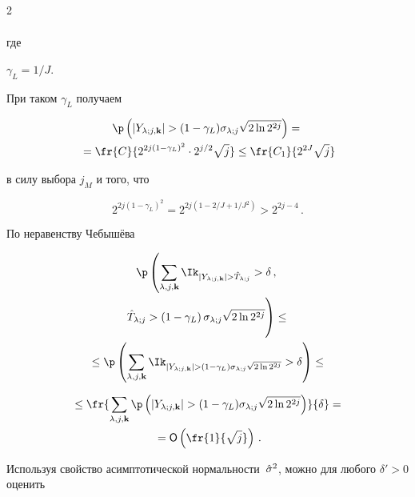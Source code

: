 \begin{multicols}{2}
\begin{multline}
\end{multline}


где


$\gamma_L = 1/J$.


При таком $\gamma_L$ получаем


\begin{multline*}


\p\left( |\Yljk| > (1-\gamma_L)\solj\sqrt{2\ln 2^{2j}} \right) = {}\\


{}=\fr{C}{ 2^{2j(1-\gamma_L)^2}\cdot 2^{j/2}\sqrt{j} } \leq \fr{C_1}{ 2^{2J} \sqrt{j} }


\end{multline*}


в силу выбора $j_M$ и того, что


\begin{equation*}


2^{2j\left(1-\gamma_L\right)^2} = 2^{2j\left( 1-2/J + 1/J^2 \right)} > 2^{2j-4}\,.


\end{equation*}


По неравенству Чебышёва


\begin{multline*}


\p\left(\sumljk\indYjkghTj>\delta\,, \right.\\


\left. \vphantom{\sumljk\indYjkghTj}\hTlj > \left( 1-\gamma_L \right) \solj\sqrt{2\ln 2^{2j}}\right) \leq{}\\


{}\leq \p\left( \sumljk \Ik_{ |\Yljk| > (1-\gamma_L)\solj\sqrt{2\ln 2^{2j}} } > \delta \right) \leq{}


\end{multline*}





\noindent


\begin{multline*}


{}\leq \fr{ \sumljk \p\left( |\Yljk| > (1-\gamma_L)\solj\sqrt{2\ln 2^{2j}} \right) }{\delta} = {}\\


{}=\Obig\left( \fr{1}{\sqrt{j}} \right)\,.


\end{multline*}





Используя свойство асимптотической нормальности~$\hat\sigma^2$, можно для любого $\delta'>0$ оценить



\end{multicols}
